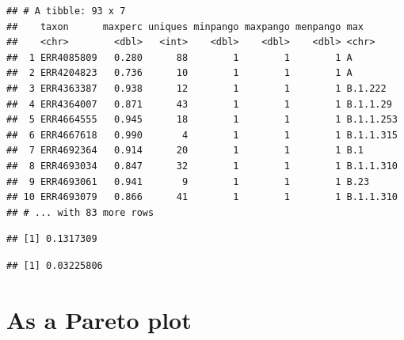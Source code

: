 \documentclass[
]{article}
\newenvironment{Shaded}{\begin{snugshade}}{\end{snugshade}}
\newcommand{\DecValTok}[1]{\textcolor[rgb]{0.00,0.00,0.81}{#1}}
\newcommand{\KeywordTok}[1]{\textcolor[rgb]{0.13,0.29,0.53}{\textbf{#1}}}
\newcommand{\NormalTok}[1]{#1}
\newcommand{\OperatorTok}[1]{\textcolor[rgb]{0.81,0.36,0.00}{\textbf{#1}}}
\newcommand{\StringTok}[1]{\textcolor[rgb]{0.31,0.60,0.02}{#1}}
\begin{document}
\begin{verbatim}
## # A tibble: 93 x 7
##    taxon      maxperc uniques minpango maxpango menpango max      
##    <chr>        <dbl>   <int>    <dbl>    <dbl>    <dbl> <chr>    
##  1 ERR4085809   0.280      88        1        1        1 A        
##  2 ERR4204823   0.736      10        1        1        1 A        
##  3 ERR4363387   0.938      12        1        1        1 B.1.222  
##  4 ERR4364007   0.871      43        1        1        1 B.1.1.29 
##  5 ERR4664555   0.945      18        1        1        1 B.1.1.253
##  6 ERR4667618   0.990       4        1        1        1 B.1.1.315
##  7 ERR4692364   0.914      20        1        1        1 B.1      
##  8 ERR4693034   0.847      32        1        1        1 B.1.1.310
##  9 ERR4693061   0.941       9        1        1        1 B.23     
## 10 ERR4693079   0.866      41        1        1        1 B.1.1.310
## # ... with 83 more rows
\end{verbatim}

\begin{Shaded}
\end{Shaded}

\begin{verbatim}
## [1] 0.1317309
\end{verbatim}

\begin{verbatim}
## [1] 0.03225806
\end{verbatim}

\hypertarget{as-a-pareto-plot}{%
\section{As a Pareto plot}\label{as-a-pareto-plot}}
\end{document}
